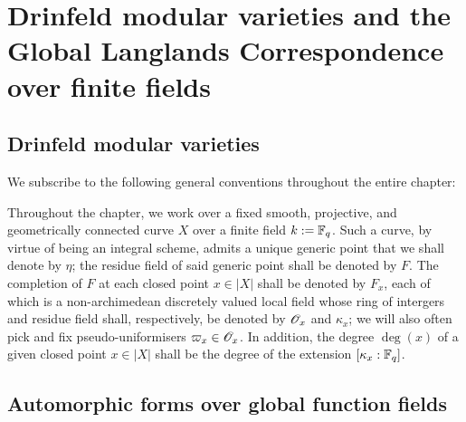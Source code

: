     \part{Drinfeld modular varieties and the Global Langlands Correspondence over finite fields}
        \chapter{Drinfeld modular varieties}
            \begin{abstract}
                
            \end{abstract}
            
            \minitoc
            
            We subscribe to the following general conventions throughout the entire chapter:
            \begin{convention}
                Throughout the chapter, we work over a fixed smooth, projective, and geometrically connected curve $X$ over a finite field $k := \mathbb{F}_q$. Such a curve, by virtue of being an integral scheme, admits a unique generic point that we shall denote by $\eta$; the residue field of said generic point shall be denoted by $F$. The completion of $F$ at each closed point $x \in |X|$ shall be denoted by $F_x$, each of which is a non-archimedean discretely valued local field whose ring of intergers and residue field shall, respectively, be denoted by $\mathscr{O}_x$ and $\kappa_x$; we will also often pick and fix pseudo-uniformisers $\varpi_x \in \mathscr{O}_x$. In addition, the degree $\deg(x)$ of a given closed point $x \in |X|$ shall be the degree of the extension $[\kappa_x : \mathbb{F}_q]$. 
            \end{convention}
            
            
            
            
            
            
            
        \chapter{Automorphic forms over global function fields}
        
